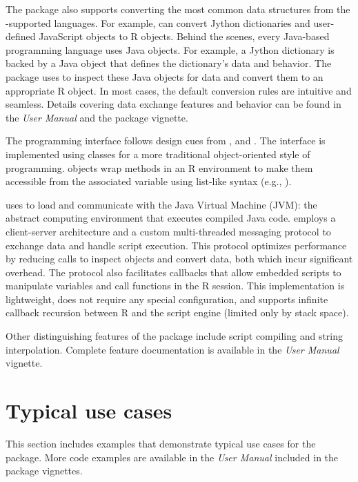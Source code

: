 The  package also supports converting the most common data structures from the -supported languages. For example,  can convert Jython dictionaries and user-defined JavaScript objects to R objects. Behind the scenes, every Java-based programming language uses Java objects. For example, a Jython dictionary is backed by a Java object that defines the dictionary's data and behavior. The  package uses  to inspect these Java objects for data and convert them to an appropriate R object. In most cases, the default conversion rules are intuitive and seamless. Details covering data exchange features and behavior can be found in the \textit{ User Manual} and the  package vignette.

The  programming interface follows design cues from , and  \citep{v8pkg}. The interface is implemented using  \citep{r6} classes for a more traditional object-oriented style of programming.  objects wrap methods in an R environment to make them accessible from the associated variable using list-like syntax (e.g., ).

 uses  to load and communicate with the Java Virtual Machine (JVM): the abstract computing environment that executes compiled Java code.  employs a client-server architecture and a custom multi-threaded messaging protocol to exchange data and handle script execution. This protocol optimizes performance by reducing  calls to inspect objects and convert data, both which incur significant overhead. The protocol also facilitates callbacks that allow embedded scripts to manipulate variables and call functions in the R session. This implementation is lightweight, does not require any special configuration, and supports infinite callback recursion between R and the script engine (limited only by stack space).

Other distinguishing features of the  package include script compiling and string interpolation. Complete feature documentation is available in the \textit{ User Manual} vignette.

\hypertarget{typical-use-cases}{}
\section{Typical use cases}

This section includes examples that demonstrate typical use cases for the  package. More code examples are available in the \textit{ User Manual} included in the package vignettes.

